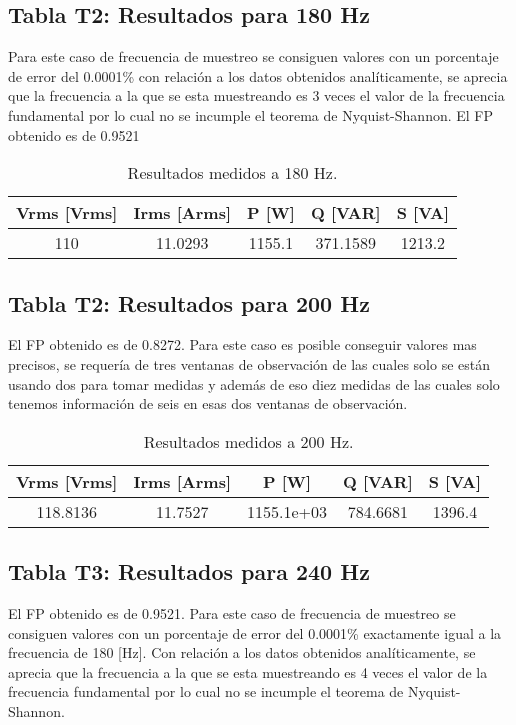 
\subsection*{Tabla T2: Resultados para 180 Hz}
Para este caso de frecuencia de muestreo se consiguen valores con un porcentaje de error del 0.0001\% con relación a los datos obtenidos analíticamente, se aprecia que la frecuencia a la que se esta muestreando es 3 veces el valor de la frecuencia fundamental por lo cual no se incumple el teorema de Nyquist-Shannon. \newline El FP obtenido es de 0.9521
\begin{table}[h!]
    \centering
    \begin{tabular}{@{}ccccc@{}}
        \toprule
        Vrms [Vrms] & Irms [Arms] & P [W] & Q [VAR] & S [VA] \\ \midrule
            110 & 11.0293 & 1155.1 & 371.1589 & 1213.2\\ 
            \bottomrule
    \end{tabular}
    \caption{Resultados medidos a 180 Hz.}
\end{table}



\subsection*{Tabla T2: Resultados para 200 Hz}
El FP obtenido es de 0.8272. Para este caso es posible conseguir valores mas precisos, se requería de tres ventanas de observación de las cuales solo se están usando dos para tomar medidas y además de eso diez medidas de las cuales solo tenemos información de seis en esas dos ventanas de observación.
\begin{table}[h!]
    \centering
    \begin{tabular}{@{}ccccc@{}}
        \toprule
        Vrms [Vrms] & Irms [Arms] & P [W] & Q [VAR] & S [VA] \\ \midrule
        118.8136 & 11.7527 & 1155.1e+03 & 784.6681 & 1396.4 \\ 
        \bottomrule
    \end{tabular}
    \caption{Resultados medidos a 200 Hz.}
\end{table}

\subsection*{Tabla T3: Resultados para 240 Hz}
El FP obtenido es de 0.9521. Para este caso de frecuencia de muestreo se consiguen valores con un porcentaje de error del 0.0001\% exactamente igual a la frecuencia de 180 [Hz]. Con relación a los datos obtenidos analíticamente, se aprecia que la frecuencia a la que se esta muestreando es 4 veces el valor de la frecuencia fundamental por lo cual no se incumple el teorema de Nyquist-Shannon. 

